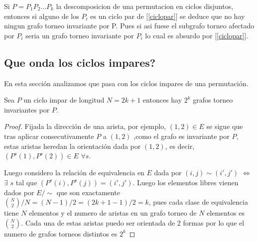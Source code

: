 		
	Si $P=P_1P_2\dots P_k$ la descomposicion de una permutacion en ciclos
disjuntos, entonces si alguno de los $P_i$ es un ciclo par de [\ref{ciclopar}] 
se deduce que no hay ningun grafo torneo invariante por P. Pues si asi
fuese el subgrafo torneo afectado por $P_i$ seria un grafo torneo 
invariante por $P_i$ lo cual es absurdo por [\ref{ciclopar}].
	
\subsection{Que onda los ciclos impares?}
	En esta secci\'on analizamos que pasa con los ciclos impares de una
permutaci\'on.


	\begin{lema}\label{cicloimpar}
		Sea $P$ un ciclo impar de longitud $N=2k+1$ entonces hay $2^k$ 
grafos torneo invariantes por $P$.
	\end{lema}
	\begin{proof}
		Fijada la direcci\'on de una arista, por ejemplo, $(1,2)\in E$
se sigue que tras aplicar consecutivamente $P$ a $(1,2)$ ,como el grafo es invariante
por $P$, estas aristas heredan la orientaci\'on dada por $(1,2)$,
es decir, $(P^s(1),P^s(2))\in E$ $\forall s$. 


		Luego considero la relaci\'on de equivalencia en $E$ dada por 
$(i,j)\sim (i',j')$ $\Leftrightarrow$ $\exists$ $s$ tal que 
$(P^s(i),P^s(j))=(i',j')$. Luego los elementos libres vienen dados por 
$E/\sim$ que son exactamente $\binom{N}{2}/N = (N-1)/2 = (2k+1-1)/2=k$, pues cada
clase de equivalencia tiene $N$ elementos y el numero de aristas en un
grafo torneo de $N$ elementos es $\binom{N}{2}$. Cada una de estas aristas 
puedo ser orientada de 2 formas por lo que el numero de grafos torneos 
distintos es $2^k$
	\end{proof}
	
